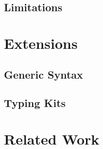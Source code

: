 \documentclass[screen,nonacm]{acmart}
\begin{document}
\subsection{Limitations}\label{sec:ags-lim}

\section{Extensions}\label{sec:ext}
\subsection{Generic Syntax}\label{sec:ext-uni}
\subsection{Typing Kits}\label{sec:ext-tyk}

% 

\section{Related Work}\label{sec:rel}

\end{document}
